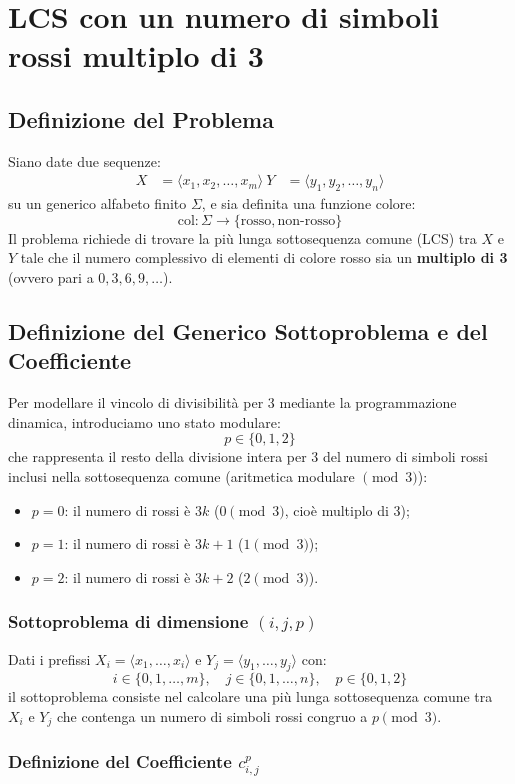 \chapter{LCS con un numero di simboli rossi multiplo di 3}\section{Definizione del Problema}Siano date due sequenze:
\begin{align*}
X &= \langle x_1, x_2, \dots, x_m \rangle \
Y &= \langle y_1, y_2, \dots, y_n \rangle
\end{align*}
su un generico alfabeto finito $\Sigma$, e sia definita una funzione colore:
$$\text{col} : \Sigma \to \{\text{rosso}, \text{non-rosso}\}$$
Il problema richiede di trovare la più lunga sottosequenza comune (LCS) tra $X$ e $Y$ tale che il numero complessivo di elementi di colore rosso sia un \textbf{multiplo di 3} (ovvero pari a $0, 3, 6, 9, \dots$).\section{Definizione del Generico Sottoproblema e del Coefficiente}Per modellare il vincolo di divisibilità per 3 mediante la programmazione dinamica, introduciamo uno stato modulare:
$$p \in \{0, 1, 2\}$$
che rappresenta il resto della divisione intera per 3 del numero di simboli rossi inclusi nella sottosequenza comune (aritmetica modulare $\pmod 3$):
\begin{itemize}
\item $p = 0$: il numero di rossi è $3k$ ($0 \pmod 3$, cioè multiplo di 3);
\item $p = 1$: il numero di rossi è $3k + 1$ ($1 \pmod 3$);
\item $p = 2$: il numero di rossi è $3k + 2$ ($2 \pmod 3$).
\end{itemize}\subsection{Sottoproblema di dimensione $(i, j, p)$}
Dati i prefissi $X_i = \langle x_1, \dots, x_i \rangle$ e $Y_j = \langle y_1, \dots, y_j \rangle$ con:
$$i \in \{0, 1, \dots, m\}, \quad j \in \{0, 1, \dots, n\}, \quad p \in \{0, 1, 2\}$$
il sottoproblema consiste nel calcolare una più lunga sottosequenza comune tra $X_i$ e $Y_j$ che contenga un numero di simboli rossi congruo a $p \pmod 3$.\subsection{Definizione del Coefficiente $c_{i,j}^p$}
